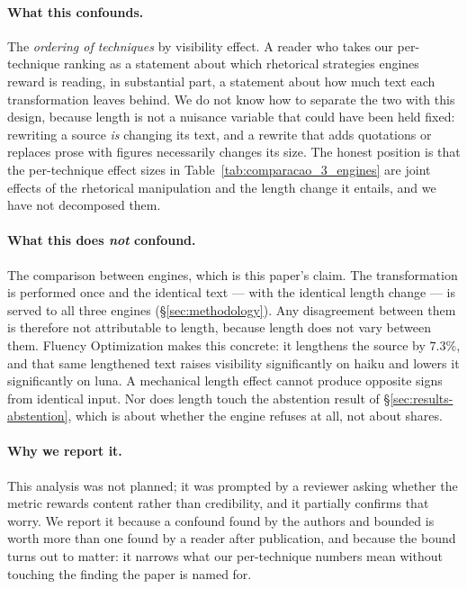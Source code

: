 \documentclass[11pt,a4paper]{article}
\begin{document}
\paragraph{What this confounds.} The \emph{ordering of techniques} by
visibility effect. A reader who takes our per-technique ranking as a
statement about which rhetorical strategies engines reward is reading, in
substantial part, a statement about how much text each transformation
leaves behind. We do not know how to separate the two with this design,
because length is not a nuisance variable that could have been held fixed:
rewriting a source \emph{is} changing its text, and a rewrite that adds
quotations or replaces prose with figures necessarily changes its size. The
honest position is that the per-technique effect sizes in
Table~\ref{tab:comparacao_3_engines} are joint effects of the rhetorical
manipulation and the length change it entails, and we have not decomposed
them.

\paragraph{What this does \emph{not} confound.} The comparison between
engines, which is this paper's claim. The transformation is performed once
and the identical text --- with the identical length change --- is served to
all three engines (\S\ref{sec:methodology}). Any disagreement between them
is therefore not attributable to length, because length does not vary
between them. Fluency Optimization makes this concrete: it lengthens the
source by $7.3\%$, and that same lengthened text raises visibility
significantly on haiku and lowers it significantly on luna. A mechanical
length effect cannot produce opposite signs from identical input. Nor does
length touch the abstention result of \S\ref{sec:results-abstention}, which
is about whether the engine refuses at all, not about shares.

\paragraph{Why we report it.} This analysis was not planned; it was
prompted by a reviewer asking whether the metric rewards content rather than
credibility, and it partially confirms that worry. We report it because a
confound found by the authors and bounded is worth more than one found by a
reader after publication, and because the bound turns out to matter: it
narrows what our per-technique numbers mean without touching the finding the
paper is named for.
\end{document}
